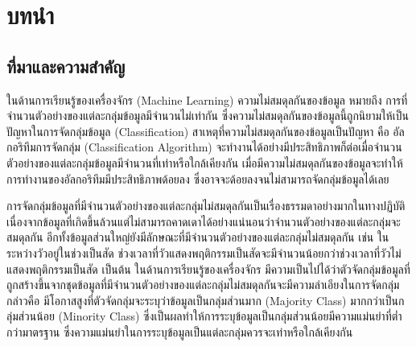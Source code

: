 \chapter{บทนำ}
\label{chapter:introduction}

\section{ที่มาและความสำคัญ}
ในด้านการเรียนรู้ของเครื่องจักร (Machine Learning) ความไม่สมดุลกันของข้อมูล หมายถึง การที่จำนวนตัวอย่างของแต่ละกลุ่มข้อมูลมีจำนวนไม่เท่ากัน ซึ่งความไม่สมดุลกันของข้อมูลนี้ถูกนิยามให้เป็นปัญหาในการจัดกลุ่มข้อมูล (Classification) สาเหตุที่ความไม่สมดุลกันของข้อมูลเป็นปัญหา คือ อัลกอริทึมการจัดกลุ่ม (Classification Algorithm) จะทำงานได้อย่างมีประสิทธิภาพก็ต่อเมื่อจำนวนตัวอย่างของแต่ละกลุ่มข้อมูลมีจำนวนที่เท่าหรือใกล้เคียงกัน เมื่อมีความไม่สมดุลกันของข้อมูลจะทำให้การทำงานของอัลกอริทึมมีประสิทธิภาพด้อยลง ซึ่งอาจจะด้อยลงจนไม่สามารถจัดกลุ่มข้อมูลได้เลย

การจัดกลุ่มข้อมูลที่มีจำนวนตัวอย่างของแต่ละกลุ่มไม่สมดุลกันเป็นเรื่องธรรมดาอย่างมากในทางปฏิบัติ เนื่องจากข้อมูลที่เกิดขึ้นล้วนแต่ไม่สามารถคาดเดาได้อย่างแน่นอนว่าจำนวนตัวอย่างของแต่ละกลุ่มจะสมดุลกัน อีกทั้งข้อมูลส่วนใหญ่ยังมีลักษณะที่มีจำนวนตัวอย่างของแต่ละกลุ่มไม่สมดุลกัน เช่น ในระหว่างวัวอยู่ในช่วงเป็นสัด ช่วงเวลาที่วัวแสดงพฤติกรรมเป็นสัดจะมีจำนวนน้อยกว่าช่วงเวลาที่วัวไม่แสดงพฤติกรรมเป็นสัด เป็นต้น ในด้านการเรียนรู้ของเครื่องจักร มีความเป็นไปได้ว่าตัวจัดกลุ่มข้อมูลที่ถูกสร้างขึ้นจากชุดข้อมูลที่มีจำนวนตัวอย่างของแต่ละกลุ่มไม่สมดุลกันจะมีความลำเอียงในการจัดกลุ่ม กล่าวคือ มีโอกาสสูงที่ตัวจัดกลุ่มจะระบุว่าข้อมูลเป็นกลุ่มส่วนมาก (Majority Class) มากกว่าเป็นกลุ่มส่วนน้อย (Minority Class) ซึ่งเป็นผลทำให้การระบุข้อมูลเป็นกลุ่มส่วนน้อยมีความแม่นยำที่ต่ำกว่ามาตรฐาน ซึ่งความแม่นยำในการระบุข้อมูลเป็นแต่ละกลุ่มควรจะเท่าหรือใกล้เคียงกัน


